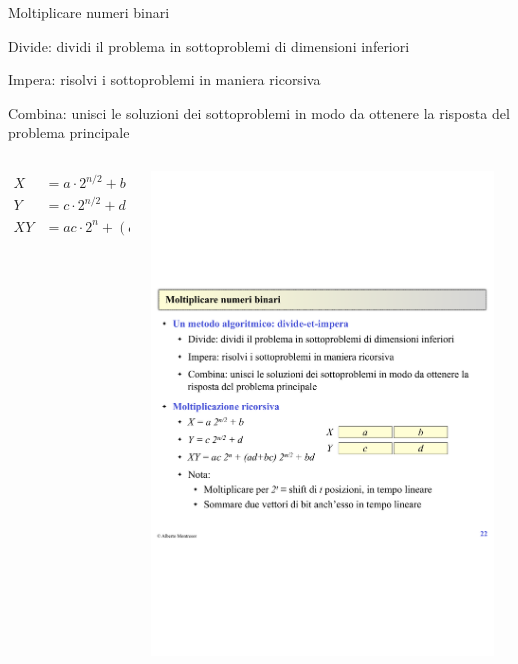 \begin{frame}{Moltiplicare numeri binari}

\vspace{-9pt}
\begin{myboxtitle}
\BI
\item \alert{Divide}: dividi il problema in sottoproblemi di dimensioni inferiori
\item \alert{Impera}: risolvi i sottoproblemi in maniera ricorsiva
\item \alert{Combina}: unisci le soluzioni dei sottoproblemi in modo da ottenere la risposta del problema principale
\EI
\end{myboxtitle}

\begin{myboxtitle}
\begin{columns}[c]
\begin{column}{0.52\textwidth}
\begin{align*}
X &= a \cdot 2^{n/2} + b  \\
Y &= c \cdot 2^{n/2} + d\\
XY &= ac \cdot 2^n + (ad+bc) \cdot 2^{n/2} + bd
\end{align*}
\end{column}
\begin{column}{0.46\textwidth}
\begin{center}
\includegraphics[width=0.95\textwidth]{mul-di.pdf}

\end{center}
\end{column}
\end{columns}
\end{myboxtitle}
\end{frame}
